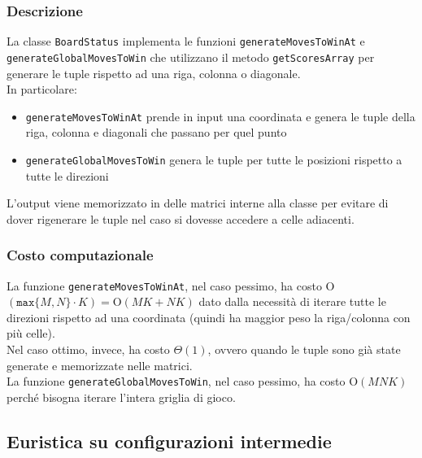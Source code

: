\documentclass[11pt]{article}
\begin{document}
\subsubsection*{Descrizione}
La classe \texttt{BoardStatus} implementa le funzioni \texttt{generateMovesToWinAt} e \texttt{generateGlobalMovesToWin} che utilizzano il metodo \texttt{getScoresArray} per generare le tuple rispetto ad una riga, colonna o diagonale.\\
In particolare: 
\begin{itemize}
\setlength\itemsep{0.05cm}
	\item \texttt{generateMovesToWinAt} prende in input una coordinata e genera le tuple della riga, colonna e diagonali che passano per quel punto
	\item \texttt{generateGlobalMovesToWin} genera le tuple per tutte le posizioni rispetto a tutte le direzioni
\end{itemize}
L'output viene memorizzato in delle matrici interne alla classe per evitare di dover rigenerare le tuple nel caso si dovesse accedere a celle adiacenti.
\subsubsection*{Costo computazionale}
La funzione \texttt{generateMovesToWinAt}, nel caso pessimo, ha costo O$(\texttt{max}\{M, N\} \cdot K) = \text{O}(MK+NK)$ dato dalla necessità di iterare tutte le direzioni rispetto ad una coordinata (quindi ha maggior peso la riga/colonna con più celle).\\
Nel caso ottimo, invece, ha costo $\Theta(1)$, ovvero quando le tuple sono già state generate e memorizzate nelle matrici.\\
La funzione \texttt{generateGlobalMovesToWin}, nel caso pessimo, ha costo O$(MNK)$ perché bisogna iterare l'intera griglia di gioco.

\subsection*{Euristica su configurazioni intermedie}
\end{document}
